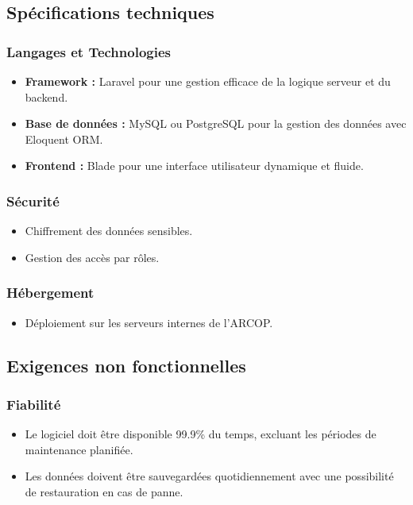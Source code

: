 \subsection{Spécifications techniques}

\subsubsection{Langages et Technologies}
\begin{itemize}
    \item \textbf{Framework :} Laravel pour une gestion efficace de la logique serveur et du backend.
    \item \textbf{Base de données :} MySQL ou PostgreSQL pour la gestion des données avec Eloquent ORM.
    \item \textbf{Frontend :} Blade pour une interface utilisateur dynamique et fluide.

\end{itemize}


\subsubsection{Sécurité}
\begin{itemize}
    \item Chiffrement des données sensibles.
    \item Gestion des accès par rôles.
\end{itemize}

\subsubsection{Hébergement}
\begin{itemize}
    \item Déploiement sur les serveurs internes de l'ARCOP.
\end{itemize}
\subsection{Exigences non fonctionnelles}


\subsubsection{Fiabilité}
\begin{itemize}
    \item Le logiciel doit être disponible 99.9\% du temps, excluant les périodes de maintenance planifiée.
    \item Les données doivent être sauvegardées quotidiennement avec une possibilité de restauration en cas de panne.
\end{itemize}

